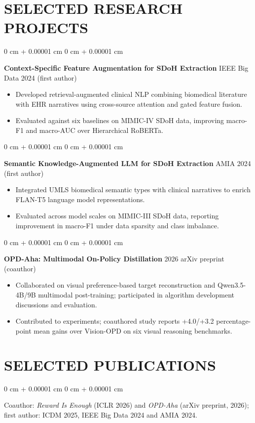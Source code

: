 \documentclass[10pt, letterpaper]{article}
\newenvironment{highlights}{
    \begin{itemize}[
        topsep=0.03 cm,
        parsep=0.03 cm,
        partopsep=0pt,
        itemsep=0pt,
        leftmargin=0 cm + 10pt
    ]
}{
    \end{itemize}
} %
\newenvironment{onecolentry}{
    \begin{adjustwidth}{
        0 cm + 0.00001 cm
    }{
        0 cm + 0.00001 cm
    }
}{
    \end{adjustwidth}
} %
\begin{document}
\section{SELECTED RESEARCH PROJECTS}
\begin{onecolentry}
\textbf{Context-Specific Feature Augmentation for SDoH Extraction} \hfill IEEE Big Data 2024 (first author)
\begin{highlights}
\item Developed retrieval-augmented clinical NLP combining biomedical literature with EHR narratives using cross-source attention and gated feature fusion.
\item Evaluated against six baselines on MIMIC-IV SDoH data, improving macro-F1 and macro-AUC over Hierarchical RoBERTa.
\end{highlights}
\end{onecolentry}
\vspace{0.025 cm}
\begin{onecolentry}
\textbf{Semantic Knowledge-Augmented LLM for SDoH Extraction} \hfill AMIA 2024 (first author)
\begin{highlights}
\item Integrated UMLS biomedical semantic types with clinical narratives to enrich FLAN-T5 language model representations.
\item Evaluated across model scales on MIMIC-III SDoH data, reporting improvement in macro-F1 under data sparsity and class imbalance.
\end{highlights}
\end{onecolentry}
\vspace{0.025 cm}
\begin{onecolentry}
\textbf{OPD-Aha: Multimodal On-Policy Distillation} \hfill 2026 arXiv preprint (coauthor)
\begin{highlights}
\item Collaborated on visual preference-based target reconstruction and Qwen3.5-4B/9B multimodal post-training; participated in algorithm development discussions and evaluation.
\item Contributed to experiments; coauthored study reports +4.0/+3.2 percentage-point mean gains over Vision-OPD on six visual reasoning benchmarks.
\end{highlights}
\end{onecolentry}
\vspace{0.025 cm}
\section{SELECTED PUBLICATIONS}
\begin{onecolentry}
Coauthor: \textit{Reward Is Enough} (ICLR 2026) and \textit{OPD-Aha} (arXiv preprint, 2026); first author: ICDM 2025, IEEE Big Data 2024 and AMIA 2024.
\end{onecolentry}
\end{document}
